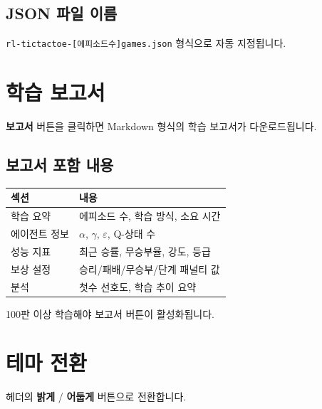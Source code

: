 \documentclass[11pt,a4paper]{article}
\begin{document}
\subsection{JSON 파일 이름}

\texttt{rl-tictactoe-[에피소드수]games.json} 형식으로 자동 지정됩니다.

\section{학습 보고서}

\textbf{ 보고서} 버튼을 클릭하면 Markdown 형식의 학습 보고서가 다운로드됩니다.

\subsection*{보고서 포함 내용}

\begin{center}
\renewcommand{\arraystretch}{1.4}
\begin{tabular}{|l|p{8cm}|}
\hline
\rowcolor{tableheader}
\textbf{섹션} & \textbf{내용} \\
\hline
학습 요약 & 에피소드 수, 학습 방식, 소요 시간 \\
\hline
에이전트 정보 & \(\alpha\), \(\gamma\), \(\varepsilon\), Q-상태 수 \\
\hline
성능 지표 & 최근 승률, 무승부율, 강도, 등급 \\
\hline
보상 설정 & 승리/패배/무승부/단계 패널티 값 \\
\hline
분석 & 첫수 선호도, 학습 추이 요약 \\
\hline
\end{tabular}
\end{center}

\begin{tipbox}
100판 이상 학습해야 보고서 버튼이 활성화됩니다.
\end{tipbox}

\section{테마 전환}

헤더의 \textbf{ 밝게} / \textbf{ 어둡게} 버튼으로 전환합니다.
\end{document}
